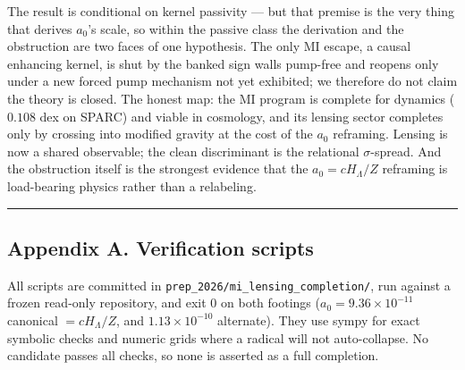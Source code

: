 \documentclass[
]{article}
\newcounter{none} %
\begin{document}
The result is conditional on kernel passivity --- but that premise is
the very thing that derives \(a_0\)'s scale, so within the passive class
the derivation and the obstruction are two faces of one hypothesis. The
only MI escape, a causal enhancing kernel, is shut by the banked sign
walls pump-free and reopens only under a new forced pump mechanism not
yet exhibited; we therefore do not claim the theory is closed. The
honest map: the MI program is complete for dynamics (\(0.108\) dex on
SPARC) and viable in cosmology, and its lensing sector completes only by
crossing into modified gravity at the cost of the \(a_0\) reframing.
Lensing is now a shared observable; the clean discriminant is the
relational \(\sigma\)-spread. And the obstruction itself is the
strongest evidence that the \(a_0=cH_\Lambda/Z\) reframing is
load-bearing physics rather than a relabeling.

\begin{center}\rule{0.5\linewidth}{0.5pt}\end{center}

\subsection{Appendix A. Verification
scripts}\label{appendix-a.-verification-scripts}

All scripts are committed in
\texttt{prep\_2026/mi\_lensing\_completion/}, run against a frozen
read-only repository, and exit 0 on both footings
(\(a_0=9.36\times10^{-11}\) canonical \(=cH_\Lambda/Z\), and
\(1.13\times10^{-10}\) alternate). They use sympy for exact symbolic
checks and numeric grids where a radical will not auto-collapse. No
candidate passes all checks, so none is asserted as a full completion.
\end{document}

